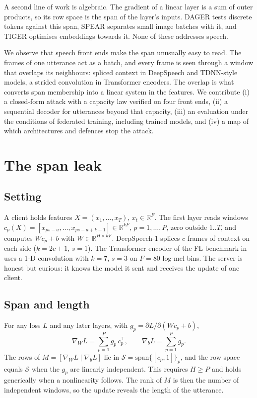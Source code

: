 \documentclass{Interspeech}
\begin{document}
A second line of work is algebraic. The gradient of a linear layer is a sum of outer products, so its
row space is the span of the layer's inputs. DAGER \cite{petrov2024dager} tests discrete tokens against
this span, SPEAR \cite{dimitrov2024spear} separates small image batches with it, and TIGER
\cite{kalikman2026tiger} optimises embeddings towards it. None of these addresses speech.

We observe that speech front ends make the span unusually easy to read. The frames of one utterance act
as a batch, and every frame is seen through a window that overlaps its neighbours: spliced context in
DeepSpeech and TDNN-style models, a strided convolution in Transformer encoders. The overlap is what
converts span membership into a linear system in the features. We contribute (i) a closed-form attack
with a capacity law verified on four front ends, (ii) a sequential decoder for utterances beyond that
capacity, (iii) an evaluation under the conditions of federated training, including trained models, and
(iv) a map of which architectures and defences stop the attack.

\section{The span leak}

\subsection{Setting}
A client holds features $X=(x_1,\dots,x_T)$, $x_t\in\mathbb{R}^F$. The first layer reads windows
$c_p(X)=[x_{ps-a},\dots,x_{ps-a+k-1}]\in\mathbb{R}^{kF}$, $p=1,\dots,P$, zero outside $1..T$, and
computes $Wc_p+b$ with $W\in\mathbb{R}^{H\times kF}$. DeepSpeech-1 splices $c$ frames of context on each
side ($k=2c+1$, $s=1$). The Transformer encoder of the FL benchmark in \cite{pelikan2025enabling} uses a
1-D convolution with $k=7$, $s=3$ on $F=80$ log-mel bins. The server is honest but curious: it knows the
model it sent and receives the update of one client.

\subsection{Span and length}
For any loss $L$ and any later layers, with $g_p=\partial L/\partial(Wc_p+b)$,
\begin{equation}
\nabla_W L=\sum_{p=1}^{P} g_p\,c_p^{\top},\qquad \nabla_b L=\sum_{p=1}^{P} g_p .
\label{eq:grad}
\end{equation}
The rows of $M=[\nabla_W L\mid\nabla_b L]$ lie in $\mathcal{S}=\mathrm{span}\{[c_p,1]\}_{p}$, and the row
space equals $\mathcal{S}$ when the $g_p$ are linearly independent. This requires $H\ge P$ and holds
generically when a nonlinearity follows. The rank of $M$ is then the number of independent windows, so
the update reveals the length of the utterance.
\end{document}
